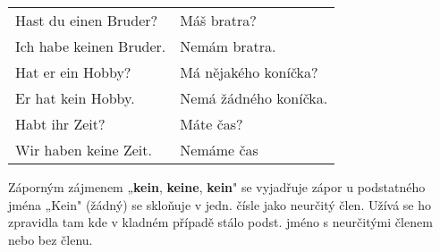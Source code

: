       \begin{table}[ht!]   
        \begin{tabular}{ll} 
          Hast du einen Bruder?   & Máš bratra?  \\
          Ich habe keinen Bruder. & Nemám bratra.\\
          Hat er ein Hobby?       & Má nějakého koníčka?\\
          Er hat kein Hobby.      & Nemá žádného koníčka.\\
          Habt ihr Zeit?          & Máte čas?\\
          Wir haben keine Zeit.   & Nemáme čas\\
        \end{tabular}
        \caption*{ }
      \end{table}
      Záporným zájmenem „\textbf{kein}, \textbf{keine}, \textbf{kein}" se vyjadřuje zápor u 
      podstatného jména „Kein" (žádný) se skloňuje v jedn. čísle jako neurčitý člen. Užívá 
      se ho zpravidla tam kde v kladném případě stálo podst. jméno s neurčitými členem nebo 
      bez členu.
    
